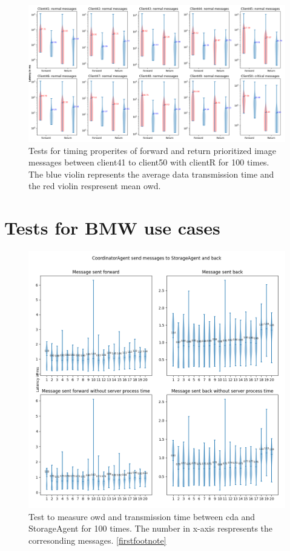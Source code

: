 \begin{figure}
    \includegraphics[width=\textheight]{figures/appendix/priority_tests/log_violin_50clients_image_figure_5.png}\hfill 
    \caption{Tests for timing properites of forward and return prioritized image messages between client41 to client50 
    with clientR for 100 times. The blue violin represents the average data transmission time and the red violin 
    respresent mean \gls{owd}.} \label{fig: priority-50clients-image-e}
\end{figure}




\newpage
\section{Tests for BMW use cases}\label{chap: append-UC}

\begin{figure}[h]
    \includegraphics[width=\textwidth]{figures/appendix/usecase/violin_CoordinatorAgent_to_StorageAgent.png}
    \centering
    \caption{Test to measure \gls{owd} and transmission time between \gls{cda} and 
    StorageAgent for 100 times. The number in x-axis respresents the 
    corresonding messages. \protect\ref{firstfootnote}}
    \label{fig: violin-CDA-ST}
\end{figure}


